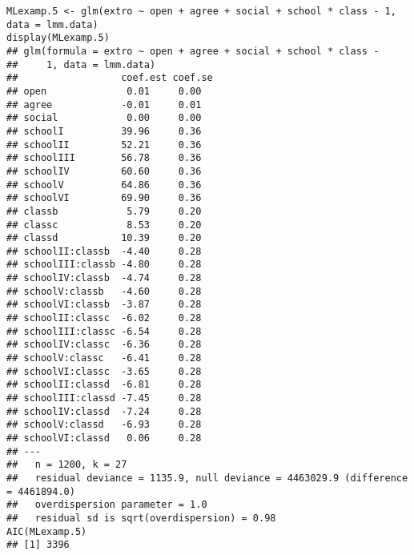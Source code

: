 \begin{framed}
	\begin{verbatim}
MLexamp.5 <- glm(extro ~ open + agree + social + school * class - 1, data = lmm.data)
display(MLexamp.5)
## glm(formula = extro ~ open + agree + social + school * class - 
##     1, data = lmm.data)
##                  coef.est coef.se
## open              0.01     0.00  
## agree            -0.01     0.01  
## social            0.00     0.00  
## schoolI          39.96     0.36  
## schoolII         52.21     0.36  
## schoolIII        56.78     0.36  
## schoolIV         60.60     0.36  
## schoolV          64.86     0.36  
## schoolVI         69.90     0.36  
## classb            5.79     0.20  
## classc            8.53     0.20  
## classd           10.39     0.20  
## schoolII:classb  -4.40     0.28  
## schoolIII:classb -4.80     0.28  
## schoolIV:classb  -4.74     0.28  
## schoolV:classb   -4.60     0.28  
## schoolVI:classb  -3.87     0.28  
## schoolII:classc  -6.02     0.28  
## schoolIII:classc -6.54     0.28  
## schoolIV:classc  -6.36     0.28  
## schoolV:classc   -6.41     0.28  
## schoolVI:classc  -3.65     0.28  
## schoolII:classd  -6.81     0.28  
## schoolIII:classd -7.45     0.28  
## schoolIV:classd  -7.24     0.28  
## schoolV:classd   -6.93     0.28  
## schoolVI:classd   0.06     0.28  
## ---
##   n = 1200, k = 27
##   residual deviance = 1135.9, null deviance = 4463029.9 (difference = 4461894.0)
##   overdispersion parameter = 1.0
##   residual sd is sqrt(overdispersion) = 0.98
AIC(MLexamp.5)
## [1] 3396
\end{verbatim}
\end{framed}

